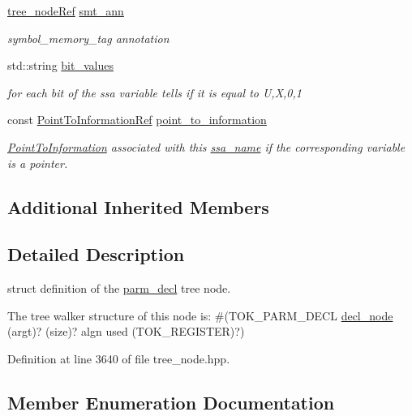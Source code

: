 \begin{DoxyCompactItemize}
\hyperlink{tree__node_8hpp_a6ee377554d1c4871ad66a337eaa67fd5}{tree\+\_\+node\+Ref} \hyperlink{structparm__decl_a251bf25da86d8d0ca169e527a2e02e9b}{smt\+\_\+ann}
\begin{DoxyCompactList}\small\item\em symbol\+\_\+memory\+\_\+tag annotation \end{DoxyCompactList}\item 
std\+::string \hyperlink{structparm__decl_af69dd2115bc8fcf211732bf350370b79}{bit\+\_\+values}
\begin{DoxyCompactList}\small\item\em for each bit of the ssa variable tells if it is equal to U,X,0,1 \end{DoxyCompactList}\item 
const \hyperlink{tree__node_8hpp_aa7470417b67a13b20fb980e600e55d8d}{Point\+To\+Information\+Ref} \hyperlink{structparm__decl_a0fb2754b9177b42d4b12ba9276f2834c}{point\+\_\+to\+\_\+information}
\begin{DoxyCompactList}\small\item\em \hyperlink{structPointToInformation}{Point\+To\+Information} associated with this \hyperlink{structssa__name}{ssa\+\_\+name} if the corresponding variable is a pointer. \end{DoxyCompactList}\end{DoxyCompactItemize}
\subsection*{Additional Inherited Members}


\subsection{Detailed Description}
struct definition of the \hyperlink{structparm__decl}{parm\+\_\+decl} tree node. 

The tree walker structure of this node is\+: \#(T\+O\+K\+\_\+\+P\+A\+R\+M\+\_\+\+D\+E\+CL \hyperlink{structdecl__node}{decl\+\_\+node} (argt)? (size)? algn used (T\+O\+K\+\_\+\+R\+E\+G\+I\+S\+T\+ER)?) 

Definition at line 3640 of file tree\+\_\+node.\+hpp.



\subsection{Member Enumeration Documentation}
\mbox{\label{structparm__decl_a22eba87dc6b9a51c4c792497ceb1dfe8}} 
